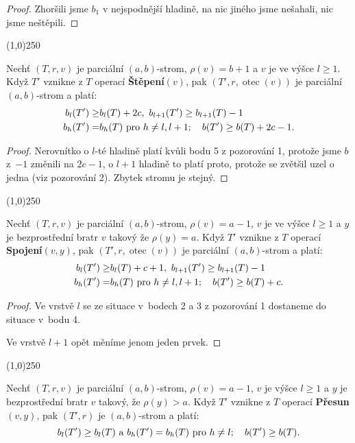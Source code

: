 \documentclass[a4paper,12pt]{article}
\newenvironment{myproof}{
  \begin{proof}
    
  }{
  \end{proof}
  \begin{center}
   \line(1,0){250}
   \end{center}
  }
\DeclareMathOperator*{\otec}{otec}
\begin{document}
\begin{myproof}
    Zhoršili jsme $b_1$ v nejspodnější hladině, na nic jiného jsme nešahali, nic jsme neštěpili.
\end{myproof}

\begin{lemma_counting}Nechť $(T,r,v)$ je parciální $(a,b)$-strom, 
$\rho (v)=b+1$ a $v$ je ve výšce $l\ge 1$. Když $T'$ vznikne z $
T$ 
operací {\bf Štěpení$(v)$}, pak $(T',r,\otec(v))$ je parciální 
$(a,b)$-strom a platí:  
\begin{align*} b_l(T')\ge&b_l(T)+2c,\text{\rm\ }b_{l+1}(T')\ge b_{l+1}(
T)-1\\
b_h(T')=&b_h(T)\text{\rm\ pro }h\ne l,l+1;\quad b(T')\ge b(T)+2c-
1.\end{align*}
\end{lemma_counting}

\begin{myproof}
    Nerovnítko o $l$-té hladině platí kvůli bodu 5 z pozorování 1, protože jsme $b$ z~$-1$ změnili na $2c-1$, o $l+1$ hladině to platí proto, protože se zvětšil uzel o jedna (viz pozorování 2). Zbytek stromu je stejný.
\end{myproof}

\begin{lemma_counting}Nechť $(T,r,v)$ je parciální $(a,b)$-strom, 
$\rho (v)=a-1$, $v$ je ve výšce $l\ge 1$ a $y$ je bezprostřední bratr $v$ takový že $\rho(y)=a$. Když $T'$ vznikne z $T$ operací {\bf Spojení$(v,y)$}, pak $(T',r,\otec(v))$ je parciální $(a,b)$-strom a 
platí:  
\begin{align*} b_l(T')\ge&b_l(T)+c+1,\text{\rm\ }b_{l+1}(T')\ge b_{l+1}
(T)-1\\
b_h(T')=&b_h(T)\text{\rm\ pro }h\ne l,l+1;\quad b(T')\ge b(T)+c.\end{align*}
\end{lemma_counting}
\begin{myproof}
    Ve vrstvě $l$ se ze situace v~bodech 2 a 3 z pozorování 1 dostaneme do situace v~bodu 4.
    
    Ve vrstvě $l+1$ opět měníme jenom jeden prvek.
\end{myproof}


\begin{lemma_counting} Nechť $(T,r,v)$ je parciální $(a,b)$-strom, 
$\rho (v)=a-1$, $v$ je výšce $l\ge 1$ a $y$ je bezprostřední bratr $v$ takový, že $\rho(y)>a$. 
Když $T'$ vznikne z $T$ operací {\bf Přesun$(v,y)$}, 
pak $(T',r)$ je $(a,b)$-strom a platí:  
$$b_l(T')\ge b_l(T)\text{\rm\ a }b_h(T')=b_h(T)\text{\rm\ pro }h\ne 
l;\quad b(T')\ge b(T).$$
\end{lemma_counting}
\end{document}
